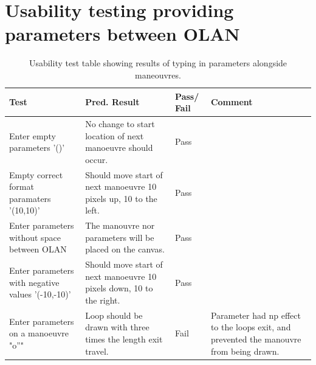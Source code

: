\clearpage

\section{Usability testing providing parameters between OLAN}
\label{test:parameters}
\begin{table}[h]
\begin{tabular}{|p{4.5cm}|p{4.5cm}|p{2cm}|p{2.5cm}|}
\hline
\textbf{Test} & \textbf{Pred. Result} & \textbf{Pass/ Fail} & \textbf{Comment}                        \\ \hline
Enter empty parameters '()'    &  No change to start location of next manoeuvre should occur.  &     Pass       &     \\ \hline
Empty correct format paramaters '(10,10)'    &  Should move start of next manoeuvre 10 pixels up, 10 to the left.  &      Pass      &     \\ \hline
Enter parameters without space between OLAN    & The manouvre nor parameters will be placed on the canvas.   &        Pass    &     \\ \hline
Enter parameters with negative values '(-10,-10)'    &  Should move start of next manoeuvre 10 pixels down, 10 to the right.  &       Pass     &     \\ \hline
Enter parameters on a manoeuvre "o''"  &  Loop should be drawn with three times the length exit travel.  &        Fail    &   Parameter had np effect to the loops exit, and prevented the manouvre from being drawn.  \\ \hline
\end{tabular}
\caption{Usability test table showing results of typing in parameters alongside maneouvres.}
\end{table}

\clearpage

